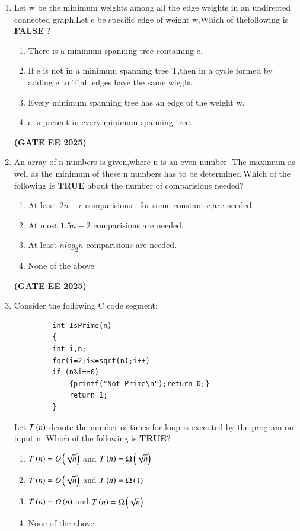 \documentclass[journal,12pt,onecolumn]{IEEEtran}
\theoremstyle{remark}
\begin{document}
\begin {center}
\begin{enumerate}
\begin{enumerate}
 \end{enumerate}
     \hfill \textbf{(GATE EE 2025)}
      
     \item Let w be the minimum weights among all the edge weights in an undirected connected graph.Let e be specific edge of weight w.Which of thefollowing is \textbf{FALSE} ?
     \begin{enumerate}
         \item There is a minimum spanning tree containing e.
         \item If e is not in a minimum spanning tree T,then in a cycle formed by adding e to T,all edges have the same wieght.
         \item Every minimum spanning tree has an edge of the weight w.
         \item e is present in every minimum spanning tree.
     \end{enumerate}
     \hfill \textbf{(GATE EE 2025)}
     \item An array of n numbers is given,where n is an even number .The maximum as well as the minimum of these n numbers has to be determined.Which of the following is \textbf{TRUE} about the number of comparisions needed?
     \begin{enumerate}
         \item  At least $2n-c$ comparisions , for some constant c,are needed.
         \item At most $1.5n-2$ comparisions are needed.
         \item At least $nlog_2 n$ comparisions are needed.
         \item None of the above 
     \end{enumerate}
     \hfill \textbf{(GATE EE 2025)}
     \item Consider the following C code segment:
     \begin{verbatim}
         int IsPrime(n)
         {
         int i,n;
         for(i=2;i<=sqrt(n);i++)
         if (n%i==0)
             {printf("Not Prime\n");return 0;}
             return 1;
         }
     \end{verbatim}
     Let $T\left(n\right)$ denote the number of times for loop is executed by the program on input n. Which of the following is \textbf{TRUE}?
     \begin{enumerate}
         \item $T\left(n\right)=O\left(\sqrt{n}\right)$ and $T\left(n\right)=\ohm\left(\sqrt{n}\right)$
         \item $T\left(n\right)=O\left(\sqrt{n}\right)$ and $T\left(n\right)=\ohm\left(1\right)$
         \item $T\left(n\right)=O\left(n\right)$ and $T\left(n\right)=\ohm\left(\sqrt{n}\right)$
         \item None of the above 
         

\end{enumerate}
\end{enumerate}
\end{center}
\end{document}
